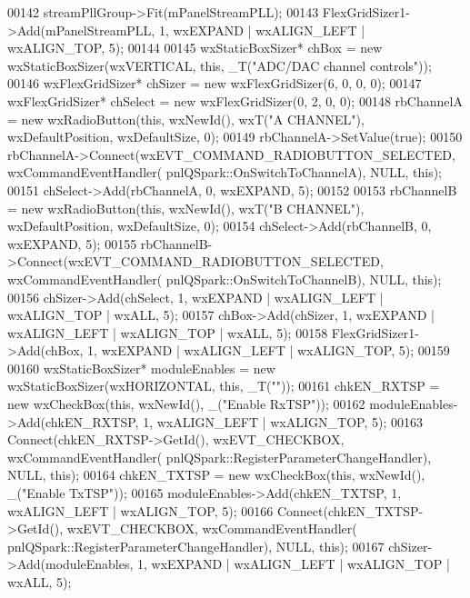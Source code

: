 \begin{DoxyCode}
00142     streamPllGroup->Fit(mPanelStreamPLL);
00143     FlexGridSizer1->Add(mPanelStreamPLL, 1, wxEXPAND | wxALIGN\_LEFT | wxALIGN\_TOP, 5);
00144 
00145     wxStaticBoxSizer* chBox = \textcolor{keyword}{new} wxStaticBoxSizer(wxVERTICAL, \textcolor{keyword}{this}, _T(\textcolor{stringliteral}{"ADC/DAC channel controls"}));
00146     wxFlexGridSizer* chSizer = \textcolor{keyword}{new} wxFlexGridSizer(6, 0, 0, 0);
00147     wxFlexGridSizer* chSelect = \textcolor{keyword}{new} wxFlexGridSizer(0, 2, 0, 0);
00148     rbChannelA = \textcolor{keyword}{new} wxRadioButton(\textcolor{keyword}{this}, wxNewId(), wxT(\textcolor{stringliteral}{"A CHANNEL"}), wxDefaultPosition, wxDefaultSize, 0);
00149     rbChannelA->SetValue(\textcolor{keyword}{true});
00150     rbChannelA->Connect(wxEVT\_COMMAND\_RADIOBUTTON\_SELECTED, wxCommandEventHandler(
      pnlQSpark::OnSwitchToChannelA), NULL, \textcolor{keyword}{this});
00151     chSelect->Add(rbChannelA, 0, wxEXPAND, 5);
00152 
00153     rbChannelB = \textcolor{keyword}{new} wxRadioButton(\textcolor{keyword}{this}, wxNewId(), wxT(\textcolor{stringliteral}{"B CHANNEL"}), wxDefaultPosition, wxDefaultSize, 0);
00154     chSelect->Add(rbChannelB, 0, wxEXPAND, 5);
00155     rbChannelB->Connect(wxEVT\_COMMAND\_RADIOBUTTON\_SELECTED, wxCommandEventHandler(
      pnlQSpark::OnSwitchToChannelB), NULL, \textcolor{keyword}{this});
00156     chSizer->Add(chSelect, 1, wxEXPAND | wxALIGN\_LEFT | wxALIGN\_TOP | wxALL, 5);
00157     chBox->Add(chSizer, 1, wxEXPAND | wxALIGN\_LEFT | wxALIGN\_TOP | wxALL, 5);
00158     FlexGridSizer1->Add(chBox, 1, wxEXPAND | wxALIGN\_LEFT | wxALIGN\_TOP, 5);
00159 
00160     wxStaticBoxSizer* moduleEnables = \textcolor{keyword}{new} wxStaticBoxSizer(wxHORIZONTAL, \textcolor{keyword}{this}, 
      _T(\textcolor{stringliteral}{""}));
00161     chkEN_RXTSP = \textcolor{keyword}{new} wxCheckBox(\textcolor{keyword}{this}, wxNewId(), \_(\textcolor{stringliteral}{"Enable RxTSP"}));
00162     moduleEnables->Add(chkEN_RXTSP, 1, wxALIGN\_LEFT | wxALIGN\_TOP, 5);
00163     Connect(chkEN_RXTSP->GetId(), wxEVT\_CHECKBOX, wxCommandEventHandler(
      pnlQSpark::RegisterParameterChangeHandler), NULL, \textcolor{keyword}{this});
00164     chkEN_TXTSP = \textcolor{keyword}{new} wxCheckBox(\textcolor{keyword}{this}, wxNewId(), \_(\textcolor{stringliteral}{"Enable TxTSP"}));
00165     moduleEnables->Add(chkEN\_TXTSP, 1, wxALIGN\_LEFT | wxALIGN\_TOP, 5);
00166     Connect(chkEN\_TXTSP->GetId(), wxEVT\_CHECKBOX, wxCommandEventHandler(
      pnlQSpark::RegisterParameterChangeHandler), NULL, \textcolor{keyword}{this});
00167     chSizer->Add(moduleEnables, 1, wxEXPAND | wxALIGN\_LEFT | wxALIGN\_TOP | wxALL, 5);

\end{DoxyCode}
